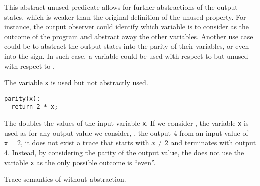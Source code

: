 This abstract unused predicate allows for further abstractions of the output states, which is weaker than the original definition of the unused property.
For instance, the output observer could identify which variable is to consider as the outcome of the program and abstract away the other variables. Another use case could be to abstract the output states into the parity of their variables, or even into the sign. In such case, a variable could be used with respect to  but unused with respect to .

  \begin{marginlisting}[*-2]
    \caption{The variable \texttt{x} is used but not abstractly used.}
    \vspace{15pt}
  \begin{lstlisting}
parity(x):
  return 2 * x;
\end{lstlisting}
  \end{marginlisting}
  \begin{example}
  The  doubles the values of the input variable \texttt{x}. If we consider , the variable \texttt{x} is used as for any output value we consider, \eg, the output 4 from an input value of $\texttt{x}=2$, it does not exist a trace that starts with $x\neq 2$ and terminates with output 4. Instead, by considering the parity of the output value, the  does not use the variable \texttt{x} as the only possible outcome is ``even''.
\end{example}
  \begin{marginfigure}[*-6]
  \caption{Trace semantics of  without abstraction.}
  \end{marginfigure}

